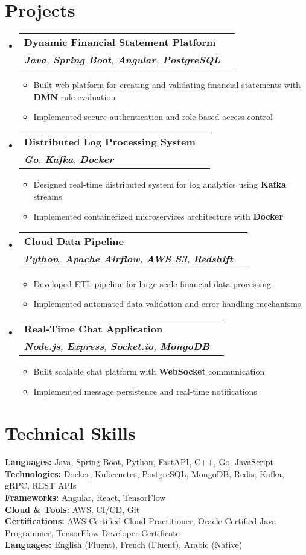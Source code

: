\documentclass[letterpaper,11pt]{article}
\makeatletter
\newcommand{\resumeItem}[1]{
    \item\small{
            {#1 \vspace{-2pt}}
    }
}
\newcommand{\resumeSubheading}[4]{
    \vspace{-2pt}\item
    \begin{tabular*}{0.97\textwidth}[t]{l@{\extracolsep{\fill}}r}
    \textbf{#1} & #2 \\
    \textit{\small#3} & \textit{\small #4} \\
    \end{tabular*}\vspace{-7pt}
}
\newcommand{\resumeSubHeadingListStart}{\begin{itemize}[leftmargin=0.15in, label={}]}
\newcommand{\resumeSubHeadingListEnd}{\end{itemize}}
\newcommand{\resumeItemListStart}{\begin{itemize}}
\newcommand{\resumeItemListEnd}{\end{itemize}\vspace{-5pt}}
\makeatother
\begin{document}
\section{Projects}
\resumeSubHeadingListStart
\resumeSubheading
{Dynamic Financial Statement Platform}{}
{\textbf{Java}, \textbf{Spring Boot}, \textbf{Angular}, \textbf{PostgreSQL}}{}
\resumeItemListStart
\resumeItem{Built web platform for creating and validating financial statements with \textbf{DMN} rule evaluation}
\resumeItem{Implemented secure authentication and role-based access control}
\resumeItemListEnd

\resumeSubheading
{Distributed Log Processing System}{}
{\textbf{Go}, \textbf{Kafka}, \textbf{Docker}}{}
\resumeItemListStart
\resumeItem{Designed real-time distributed system for log analytics using \textbf{Kafka} streams}
\resumeItem{Implemented containerized microservices architecture with \textbf{Docker}}
\resumeItemListEnd

\resumeSubheading
{Cloud Data Pipeline}{}
{\textbf{Python}, \textbf{Apache Airflow}, \textbf{AWS S3}, \textbf{Redshift}}{}
\resumeItemListStart
\resumeItem{Developed ETL pipeline for large-scale financial data processing}
\resumeItem{Implemented automated data validation and error handling mechanisms}
\resumeItemListEnd

\resumeSubheading
{Real-Time Chat Application}{}
{\textbf{Node.js}, \textbf{Express}, \textbf{Socket.io}, \textbf{MongoDB}}{}
\resumeItemListStart
\resumeItem{Built scalable chat platform with \textbf{WebSocket} communication}
\resumeItem{Implemented message persistence and real-time notifications}
\resumeItemListEnd
\resumeSubHeadingListEnd

\section{Technical Skills}
\begin{itemize}[leftmargin=0.15in, label={}]
\small{\item{
    \textbf{Languages:} Java, Spring Boot, Python, FastAPI, C++, Go, JavaScript \\
    \textbf{Technologies:} Docker, Kubernetes, PostgreSQL, MongoDB, Redis, Kafka, gRPC, REST APIs \\
    \textbf{Frameworks:} Angular, React, TensorFlow \\
    \textbf{Cloud \& Tools:} AWS, CI/CD, Git \\
    \textbf{Certifications:} AWS Certified Cloud Practitioner, Oracle Certified Java Programmer, TensorFlow Developer Certificate \\
    \textbf{Languages:} English (Fluent), French (Fluent), Arabic (Native)
}}
\end{itemize}
\end{document}
